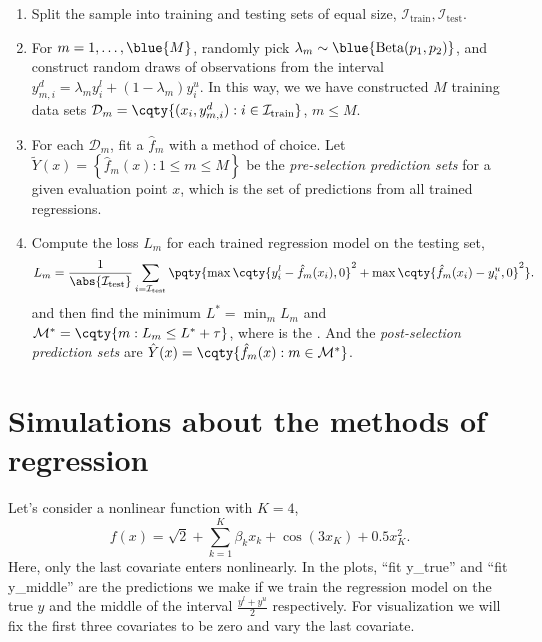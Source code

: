 \documentclass[12pt]{article}
\begin{document}
    \begin{enumerate}
        \item Split the sample into training and testing sets of equal size, \(\mathcal{I}_{\text{train}}, \mathcal{I}_{\text{test}}\). 
        \item For \(m = 1,\dots, \blue{M}\), randomly pick \(\lambda_{m} \sim \blue{\text{Beta}(p_{1}, p_{2})}\), and construct random draws of observations from the interval \(y_{m,i}^{d} = \lambda_{m}y^{l}_{i} + (1 - \lambda_{m}) y^{u}_{i}\). In this way, we we have constructed \(M\) training data sets \(\mathcal{D}_{m} = \cqty{(x_{i}, y_{m,i}^{d}): i \in \mathcal{I}_{\text{train}}}\), \(m\leq M\). 
        \item For each \(\mathcal{D}_{m}\), fit a  \(\hat{f}_{m}\) with a method of choice. Let \(\tilde{Y}(x) = \left\{\hat{f}_{m}(x): 1\leq m\leq M\right\}\) be the \textit{pre-selection prediction sets} for a given evaluation point \(x\), which is the set of predictions from all trained regressions.
        \item Compute the loss \(L_{m}\) for each trained regression model on the testing set,
        \begin{equation*}
            L_{m} = \frac{1}{\abs{\mathcal{I}_{\text{test}}}}\sum_{i = \mathcal{I}_{\text{test}}} \pqty{\max\cqty{y_{i}^{l} - \hat{f}_{m}(x_{i}), 0}^{2} + \max\cqty{\hat{f}_{m}(x_{i}) - y_{i}^{u}, 0}^{2}}.
        \end{equation*}
        and then find the  minimum \(L^{*} = \min_{m} L_{m}\) and \(\mathcal{M}^{*} = \cqty{m: L_{m} \leq L^{*} + \tau}\), where \blue{\(\tau\)} is the . And the \textit{post-selection prediction sets} are \(\hat{Y}(x) = \cqty{\hat{f}_{m}(x): m\in \mathcal{M}^{*}}\).
    \end{enumerate}

    \section{Simulations about the methods of regression}
        Let's consider a nonlinear function with \(K = 4\),
        \begin{equation*}
            f(x) = \sqrt{2} + \sum_{k = 1}^{K} \beta_{k} x_{k} + \cos(3x_{K}) + 0.5 x_{K}^{2}.
        \end{equation*}
        Here, only the last covariate enters nonlinearly. In the plots, ``fit y\_true'' and ``fit y\_middle'' are the predictions we make if we train the regression model on the true \(y\) and the middle of the interval \(\frac{y^{l} + y^{u}}{2}\) respectively.
        For visualization we will fix the first three covariates to be zero and vary the last covariate.
\end{document}
